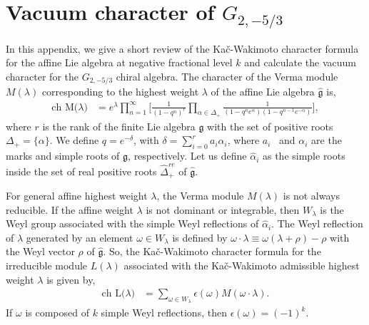 \documentclass[a4paper,12pt]{article}
\begin{document}
\section{Vacuum character of \ensuremath{G_{2,-5/3}}}\label{Details of vacuum character}

In this appendix, we give a short review of the Ka\v c-Wakimoto character formula \cite{kac_1990} for the affine Lie algebra at negative fractional level $k$ and calculate the vacuum character for the $G_{2,-5/3}$ chiral algebra. The character of the Verma module $M(\lambda)$ corresponding to the highest weight $\lambda$ of the affine Lie algebra $\hat{\mathfrak{g}}$ is,
%
\begin{align}
  \text{ch M($\lambda$)} &=e^{\lambda}\prod_{n=1}^\infty\Bigg[\frac{1}{(1-q^n)^{{r}}}\prod_{{\alpha}\in {\Delta}_+}\frac{1}{(1-q^ne^{{\alpha}})(1-q^{n-1}e^{-{\alpha}})}\Bigg],
\end{align}
%
where $r$ is the rank of the finite Lie algebra $\mathfrak{g}$ with the set of positive roots $\Delta_+=\{\alpha\}$. We define $q=e^{-\delta}$, with $\delta=\sum_{i=0}^r a_i\alpha_i$, where $a_i$  and $\alpha_i$ are the marks and simple roots of $\mathfrak{g}$, respectively. Let us define $\hat{\alpha}_i$ as the simple roots inside the set of real positive roots $\hat{\Delta}^{re}_+$ of $\hat{\mathfrak{g}}$. 

For general affine highest weight $\lambda$, the Verma module $M(\lambda)$ is not always reducible. If the affine weight $\lambda$ is not dominant or integrable, then $W_\lambda$ is the Weyl group associated with the simple Weyl reflections of $\hat{\alpha}_i$. The Weyl reflection of $\lambda$ generated by an element $\omega\in W_\lambda$ is defined by $\omega\cdot\lambda\equiv\omega(\lambda+\rho)-\rho$ with the Weyl vector $\rho$ of $\hat{\mathfrak{g}}$. So, the Ka\v c-Wakimoto character formula for the irreducible module $L(\lambda)$ associated with the Ka\v c-Wakimoto admissible highest weight $\lambda$ is given by,
%
\begin{align}
   \text{ch L($\lambda$)} &=\sum_{\omega\in W_\lambda} \epsilon(\omega) M(\omega\cdot\lambda).
\end{align}
%
If $\omega$ is composed of $k$ simple Weyl reflections, then $\epsilon(\omega)=(-1)^k$.
\end{document}
